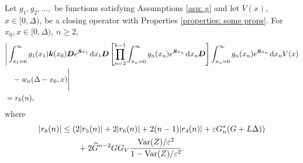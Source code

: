 \begin{cor}\label{cor: ahjg}
	Let \(g_1,g_2,\dots,\) be functions satisfying Assumptions \ref{asu: g} and let \(V(x)\), \(x\in[0,\Delta)\), be a closing operator with Properties \ref{properties: some props}. For \(x_0,x\in\mathcal [0,\Delta)\), \(n\geq 2\), 
	\begin{align}
		&\Bigg| \int_{x_1=0}^\infty g_1(x_1) \boldsymbol k(x_0) \boldsymbol D e^{\boldsymbol{S}x_1}\, \mathrm{d} x_1\boldsymbol D 
            	\left[\prod_{n=2}^{k-1}\int_{x_n=0}^\infty g_n(x_n) e^{\boldsymbol{S}x_n} \, \mathrm{d} x_n
		\boldsymbol D\right]
            	\int_{x_n=0}^\infty g_{n}(x_n) e^{\boldsymbol{S}x_n} \, \mathrm{d} x_n V(x) \nonumber 
		\\&\quad{}- w_n(\Delta - x_0,x) \Bigg| \nonumber
		\\&= r_8(n),
	\end{align}
	where 
	\begin{align*}
	|r_8(n)|&\leq  \left( 2|r_5(n)| + 2|r_6(n)| + 2(n-1)|r_4(n)| + \varepsilon G_n^{*}(G+L\Delta) \right) \\&\qquad{}+ 2\widehat G^{n-2}GG_V\cfrac{\mathrm{Var}(Z)/\varepsilon^2}{1-\mathrm{Var}(Z)/\varepsilon^2}.\end{align*}
\end{cor}
